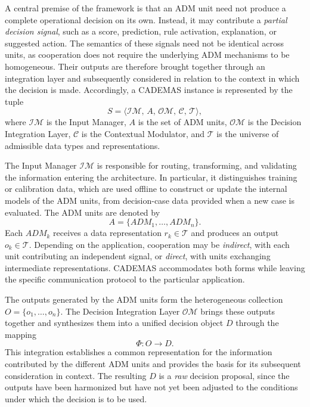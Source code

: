 A central premise of the framework is that an ADM unit need not produce a complete operational decision on its own. Instead, it may contribute a \emph{partial decision signal}, such as a score, prediction, rule activation, explanation, or suggested action. The semantics of these signals need not be identical across units, as cooperation does not require the underlying ADM mechanisms to be homogeneous. Their outputs are therefore brought together through an integration layer and subsequently considered in relation to the context in which the decision is made. Accordingly, a CADEMAS instance is represented by the tuple
\begin{equation*}
S=\langle \mathcal{IM},\,A,\,\mathcal{OM},\,\mathcal{C},\,\mathcal{T}\rangle,
\end{equation*}
where $\mathcal{IM}$ is the Input Manager, $A$ is the set of ADM units, $\mathcal{OM}$ is the Decision Integration Layer, $\mathcal{C}$ is the Contextual Modulator, and $\mathcal{T}$ is the universe of admissible data types and representations.

The Input Manager $\mathcal{IM}$ is responsible for routing, transforming, and validating the information entering the architecture. In particular, it distinguishes training or calibration data, which are used offline to construct or update the internal models of the ADM units, from decision-case data provided when a new case is evaluated. The ADM units are denoted by
\begin{equation*}
A=\{ADM_1,\ldots,ADM_n\}.
\end{equation*}
Each $ADM_k$ receives a data representation $r_k\in\mathcal{T}$ and produces an output $o_k\in\mathcal{T}$. Depending on the application, cooperation may be \emph{indirect}, with each unit contributing an independent signal, or \emph{direct}, with units exchanging intermediate representations. CADEMAS accommodates both forms while leaving the specific communication protocol to the particular application.

The outputs generated by the ADM units form the heterogeneous collection $O=\{o_1,\ldots,o_n\}$. The Decision Integration Layer $\mathcal{OM}$ brings these outputs together and synthesizes them into a unified decision object $D$ through the mapping
\begin{equation*}
\Phi:O\rightarrow D.
\end{equation*}
This integration establishes a common representation for the information contributed by the different ADM units and provides the basis for its subsequent consideration in context. The resulting $D$ is a \emph{raw} decision proposal, since the outputs have been harmonized but have not yet been adjusted to the conditions under which the decision is to be used.

